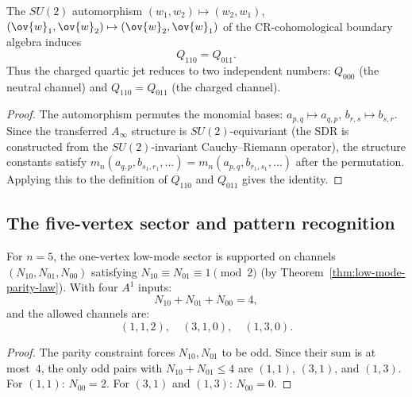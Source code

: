 \begin{proposition}
The $SU(2)$ automorphism $(w_1, w_2) \mapsto (w_2, w_1)$,
$(\ov{w}_1, \ov{w}_2) \mapsto (\ov{w}_2, \ov{w}_1)$ of the CR-cohomological
boundary algebra induces
\[
Q_{110} = Q_{011}.
\]
Thus the charged quartic jet reduces to two independent numbers: $Q_{000}$ (the
neutral channel) and $Q_{110} = Q_{011}$ (the charged channel).
\end{proposition}

\begin{proof}
The automorphism permutes the monomial bases:
$a_{p,q} \mapsto a_{q,p}$, $b_{r,s} \mapsto b_{s,r}$. Since the transferred
$A_\infty$ structure is $SU(2)$-equivariant (the SDR is constructed from the
$SU(2)$-invariant Cauchy--Riemann operator), the structure constants satisfy
$m_n(a_{q,p}, b_{s_1,r_1}, \ldots) = m_n(a_{p,q}, b_{r_1,s_1}, \ldots)$ after
the permutation. Applying this to the definition of $Q_{110}$ and $Q_{011}$
gives the identity.
\end{proof}

\subsection{The five-vertex sector and pattern recognition}

\begin{theorem}
For $n = 5$, the one-vertex low-mode sector is supported on channels
$(N_{10}, N_{01}, N_{00})$ satisfying $N_{10} \equiv N_{01} \equiv 1 \pmod{2}$
(by Theorem~\ref{thm:low-mode-parity-law}). With four $A^1$ inputs:
\[
N_{10} + N_{01} + N_{00} = 4,
\]
and the allowed channels are:
\[
(1,1,2),\quad (3,1,0),\quad (1,3,0).
\]
\end{theorem}

\begin{proof}
The parity constraint forces $N_{10}, N_{01}$ to be odd. Since their sum is at most~$4$,
the only odd pairs with $N_{10} + N_{01} \leq 4$ are $(1,1)$, $(3,1)$, and $(1,3)$.
For $(1,1)$: $N_{00} = 2$. For $(3,1)$ and $(1,3)$: $N_{00} = 0$.
\end{proof}

